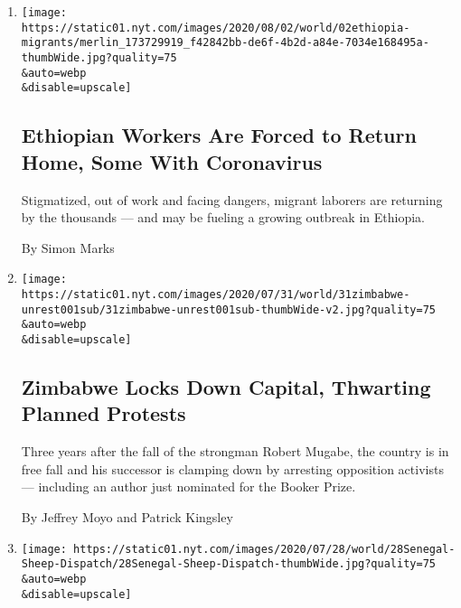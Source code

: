 \begin{enumerate}
\def\labelenumi{\arabic{enumi}.}
\item
  \href{/2020/08/01/world/africa/ethiopian-migrant-workers-coronavirus.html}{}

  \texttt{[image: https://static01.nyt.com/images/2020/08/02/world/02ethiopia-migrants/merlin\_173729919\_f42842bb-de6f-4b2d-a84e-7034e168495a-thumbWide.jpg?quality=75\\\&auto=webp\\\&disable=upscale]}

  \hypertarget{ethiopian-workers-are-forced-to-return-home-some-with-coronavirus}{%
  \subsection{Ethiopian Workers Are Forced to Return Home, Some With
  Coronavirus}\label{ethiopian-workers-are-forced-to-return-home-some-with-coronavirus}}

  Stigmatized, out of work and facing dangers, migrant laborers are
  returning by the thousands --- and may be fueling a growing outbreak
  in Ethiopia.

  By Simon Marks
\item
  \href{/2020/07/31/world/africa/zimbabwe-coronavirus-protest.html}{}

  \texttt{[image: https://static01.nyt.com/images/2020/07/31/world/31zimbabwe-unrest001sub/31zimbabwe-unrest001sub-thumbWide-v2.jpg?quality=75\\\&auto=webp\\\&disable=upscale]}

  \hypertarget{zimbabwe-locks-down-capital-thwarting-planned-protests}{%
  \subsection{Zimbabwe Locks Down Capital, Thwarting Planned
  Protests}\label{zimbabwe-locks-down-capital-thwarting-planned-protests}}

  Three years after the fall of the strongman Robert Mugabe, the country
  is in free fall and his successor is clamping down by arresting
  opposition activists --- including an author just nominated for the
  Booker Prize.

  By Jeffrey Moyo and Patrick Kingsley
\item
  \href{/2020/07/29/world/africa/senegal-tabaski-sheep-eid-adha.html}{}

  \texttt{[image: https://static01.nyt.com/images/2020/07/28/world/28Senegal-Sheep-Dispatch/28Senegal-Sheep-Dispatch-thumbWide.jpg?quality=75\\\&auto=webp\\\&disable=upscale]}


\end{enumerate}
